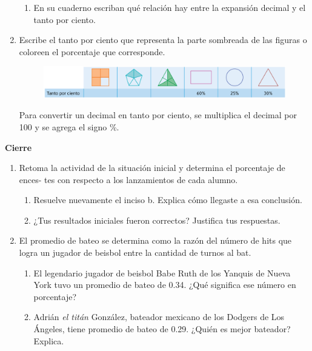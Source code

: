 \documentclass[11pt]{book}
\begin{document}
\begin{enumerate}
        \begin{enumerate}
          \item En su cuaderno escriban qué relación hay entre la expansión decimal y el tanto por
                ciento.
        \end{enumerate}
  \item Escribe el tanto por ciento que representa la parte sombreada de las
        figuras o coloreen el porcentaje que corresponde.
        \begin{figure}[H]
          \centering
          \includegraphics[width=0.8\linewidth]{tabla_figuras.png}
          \label{fig:tabla_figuras}
        \end{figure}
        \begin{boxH}
          Para convertir un decimal en tanto por ciento, se multiplica el decimal por 100 y
          se agrega el signo \%.
        \end{boxH}
\end{enumerate}

\begin{boxK}
  \begin{center}\textbf{Cierre}\end{center}

  \begin{enumerate}
    \item Retoma la actividad de la situación inicial y determina el porcentaje de ences-
          tes con respecto a los lanzamientos de cada alumno.
          \begin{enumerate}
            \item Resuelve nuevamente el inciso b. Explica cómo llegaste a esa conclusión.
            \item ¿Tus resultados iniciales fueron correctos? Justifica tus respuestas.
          \end{enumerate}
    \item El promedio de bateo se determina como la razón del número de hits que logra
          un jugador de beisbol entre la cantidad de turnos al bat.\\
          \begin{enumerate}
            \item  El legendario jugador de beisbol Babe Ruth de los Yanquis de Nueva York tuvo
                  un promedio de bateo de 0.34. ¿Qué significa ese número en porcentaje?
            \item Adrián \emph{el titán} González, bateador mexicano de los Dodgers de Los Ángeles,
                  tiene promedio de bateo de 0.29. ¿Quién es mejor bateador? Explica.
          \end{enumerate}
  \end{enumerate}
\end{boxK}
\newpage
\end{document}
